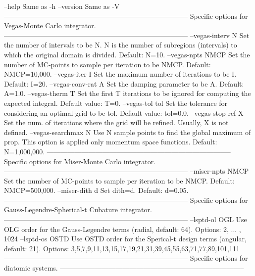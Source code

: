   --help    		Same as -h
  --version 		Same as -V
--------------------------------------------------------------------------------
               Specific options for Vegas-Monte Carlo integrator.
--------------------------------------------------------------------------------
  --vegas-interv  N  	Set the number of intervals to be N. N is the number of
                     	  subregions (intervals) to which the original domain is
                     	  divided. Default: N=10.
  --vegas-npts NMCP  	Set the number of MC-points to sample per iteration
                     	  to be NMCP. Default: NMCP=10,000.
  --vegas-iter I     	Set the maximum number of iterations to be I.
                     	  Default: I=20.
  --vegas-conv-rat A 	Set the damping parameter to be A.
                     	  Default: A=1.0.
  --vegas-therm T    	Set the first T iterations to be ignored for computing
                     	  the expected integral. Default value: T=0.
  --vegas-tol tol    	Set the tolerance for considering an optimal grid to be
                     	  tol. Default value: tol=0.0.
  --vegas-stop-ref X 	Set the num. of iterations where the grid will be
                     	  refined. Usually, X is not defined.
  --vegas-searchmax N	Use N sample points to find the global maximum of prop.
                     	  This option is applied only momentum space functions.
                     	  Default: N=1,000,000.
--------------------------------------------------------------------------------
               Specific options for Miser-Monte Carlo integrator.
--------------------------------------------------------------------------------
  --miser-npts NMCP  	Set the number of MC-points to sample per iteration
                     	  to be NMCP. Default: NMCP=500,000.
  --miser-dith d     	Set dith=d. Default: d=0.05.
--------------------------------------------------------------------------------
      Specific options for Gauss-Legendre-Spherical-t Cubature integrator.
--------------------------------------------------------------------------------
  --lsptd-ol OGL     	Use OLG order for the Gauss-Legendre terms (radial,
                     	   default: 64).
                     	  Options: 2, ... , 1024
  --lsptd-os OSTD    	Use OSTD order for the Sperical-t design terms (angular,
                     	   default: 21).
                     	  Options: 3,5,7,9,11,13,15,17,19,21,31,39,45,55,63,71,77,89,101,111
--------------------------------------------------------------------------------
                     Specific options for diatomic systems.
--------------------------------------------------------------------------------
